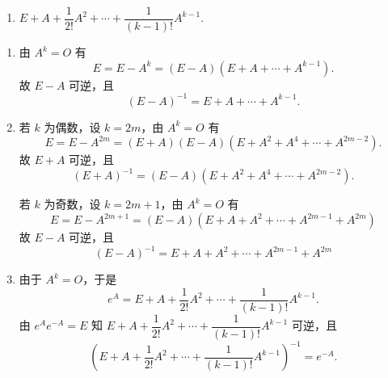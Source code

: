 \begin{exercise}
\begin{exgroup}
\begin{enumerate}
            \item $E+A+\dfrac{1}{2!}A^2+\cdots+\dfrac{1}{(k-1)!}A^{k-1}$.
        \end{enumerate}
        \begin{answer}
            \begin{enumerate}
                \item 由 $ A^k = O $ 有
                      \[ E = E - A^k = (E - A)(E + A + \cdots + A^{k - 1}). \]
                      故 $ E - A $ 可逆，且
                      \[ (E - A)^{-1} = E + A + \cdots + A^{k - 1}. \]

                \item 若 $ k $ 为偶数，设 $ k = 2m $，由 $ A^k = O $ 有
                      \[ E = E - A^{2m} = (E + A)(E - A)(E + A^2 + A^4 + \cdots + A^{2m - 2}). \]
                      故 $ E + A $ 可逆，且
                      \[ (E + A)^{-1} = (E - A)(E + A^2 + A^4 + \cdots + A^{2m - 2}). \]

                      若 $ k $ 为奇数，设 $ k = 2m + 1 $，由 $ A^k = O $ 有
                      \[ E = E - A^{2m + 1} = (E - A)(E + A + A^2 + \cdots + A^{2m - 1} + A^{2m}) \]
                      故 $ E - A $ 可逆，且
                      \[ (E - A)^{-1} = E + A + A^2 + \cdots + A^{2m - 1} + A^{2m} \]

                \item 由于 $ A^k = O $，于是
                      \[ e^A = E + A + \frac{1}{2!} A^2 + \cdots + \frac{1}{(k - 1)!} A^{k - 1}. \]
                      由 $ e^A e^{-A} = E $ 知 $ E + A + \dfrac{1}{2!} A^2 + \cdots + \dfrac{1}{(k - 1)!} A^{k - 1} $ 可逆，且
                      \[ (E + A + \frac{1}{2!} A^2 + \cdots + \frac{1}{(k - 1)!} A^{k - 1})^{-1} = e^{-A}. \]
            \end{enumerate}
        \end{answer}


\end{exgroup}
\end{exercise}
